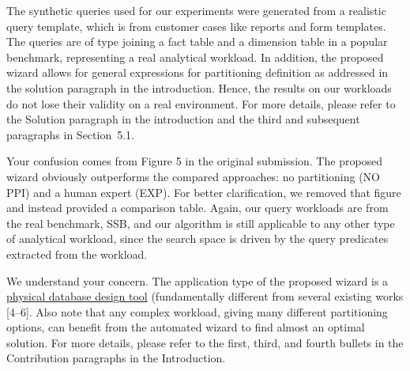 \documentclass[10pt,letterpaper]{article}
\newenvironment{myindentpar}[1]%
{\begin{list}{}
         {\vspace{10pt}
					\setlength{\leftmargin}{#1}}
          \item[]
}
{\end{list}}
\newcommand{\rev}[1]{\begin{myindentpar}{.25in} {\em {\color{blue}{#1}}}\end{myindentpar}}
\begin{document}
The synthetic queries used for our experiments were generated from a realistic query template, which is from customer cases like reports and form templates. The queries are of type joining a fact table and a dimension table in a popular benchmark, representing a real analytical workload. 
In addition, the proposed wizard allows for general expressions for partitioning definition as addressed in the solution paragraph in the introduction. Hence, the results on our workloads do not lose their validity on a real environment. For more details, please refer to the Solution paragraph in the introduction and the third and subsequent paragraphs in Section~5.1.
 
\rev{
According to the bar-shaped results, the WIZARD does not provide optimal results compared to the state-of the arts. They must clearly be expressed how this cases can be used in the real-time scenarios. 
}

Your confusion comes from Figure 5 in the original submission. The proposed wizard obviously outperforms the compared approaches: no partitioning (NO PPI) and a human expert (EXP). For better clarification, we removed that figure and instead provided a comparison table. Again, our query workloads are from the real benchmark, SSB, and our algorithm is still applicable to any other type of analytical workload, since the search space is driven by the query predicates extracted from the workload.

\rev{
Also, Authors should give a more clear definition of the ``application type" used in the paper. For example, what information of applications are used and how to obtain this information. 
}

We understand your concern. The application type of the proposed wizard is a \underline{physical database design tool} (fundamentally different from several existing works [4--6]. Also note that any complex workload, giving many different partitioning options, can benefit from the automated wizard to find almost an optimal solution. For more details, please refer to the first, third, and fourth bullets in the Contribution paragraphs in the Introduction.
\end{document}
